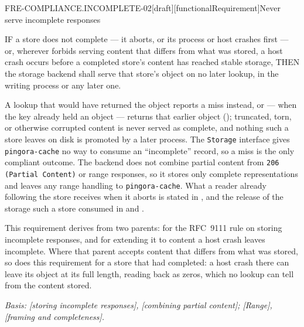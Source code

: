 \begin{requirement}{FRE-COMPLIANCE.INCOMPLETE-02}[draft][functionalRequirement]{Never serve incomplete responses}


  IF a store does not complete --- it aborts, or its process or host crashes
  first --- or, wherever  forbids
  serving content that differs from what was stored, a host crash occurs
  before a completed store's content has reached stable storage, THEN the
  storage backend shall serve that store's object on no later lookup, in the
  writing process or any later one.

  A lookup that would have returned the object reports a miss instead, or ---
  when the key already held an object --- returns that earlier object
  (); truncated, torn, or otherwise
  corrupted content is never served as complete, and nothing such a store
  leaves on disk is promoted by a later process. The \texttt{Storage}
  interface gives \texttt{pingora-cache} no way to consume an ``incomplete''
  record, so a miss is the only compliant outcome. The backend does not
  combine partial content from \texttt{206 (Partial Content)} or range
  responses, so it stores only complete representations and leaves any range
  handling to \texttt{pingora-cache}. What a reader already following the
  store receives when it aborts is stated in
  , and the release of the storage
  such a store consumed in  and
  .

  This requirement derives from two parents: 
  for the RFC~9111 rule on storing incomplete responses, and
   for extending it to content a host
  crash leaves incomplete. Where that parent accepts content that differs
  from what was stored, so does this requirement for a store that had
  completed: a host crash there can leave its object at its full length,
  reading back as zeros, which no lookup can tell from the content stored.

  \textit{Basis: [storing incomplete responses],
  [combining partial content]; [Range],
  [framing and completeness].}



\end{requirement}
